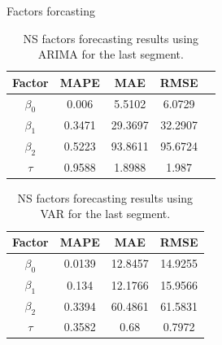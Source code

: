\documentclass[aspectratio=169]{beamer}
\begin{document}
    \begin{frame}{Factors forcasting}
        \begin{table}[H]
        \begin{center}
            \begin{tabular}{|c|c|c|c|c|}
                \hline
            Factor    &  MAPE         & MAE         & RMSE          \\ \hline
            $\beta_0$ &  0.006        & 5.5102      & 6.0729        \\ \hline 
            $\beta_1$ &  0.3471       & 29.3697     & 32.2907       \\ \hline 
            $\beta_2$ &  0.5223       & 93.8611     & 95.6724       \\ \hline 
            $\tau$    &  0.9588       & 1.8988      & 1.987         \\ \hline
            \end{tabular}
        \end{center}
        \caption{NS factors forecasting results using ARIMA for the last segment.}
    \end{table} 
    \begin{table}[H]
        \begin{center}
            \begin{tabular}{|c|c|c|c|}
                \hline
            Factor    &  MAPE         & MAE         & RMSE          \\ \hline
    
            $\beta_0$ &  0.0139       & 12.8457     & 14.9255       \\ \hline 
            $\beta_1$ &  0.134        &  12.1766    &  15.9566      \\ \hline 
            $\beta_2$ &  0.3394       & 60.4861     &  61.5831      \\ \hline 
            $\tau$    &  0.3582       &  0.68       &  0.7972       \\ \hline
            \end{tabular}
            \caption{NS factors forecasting results using VAR for the last segment.}
        \end{center}
    \end{table} 



    \end{frame}
\end{document}
